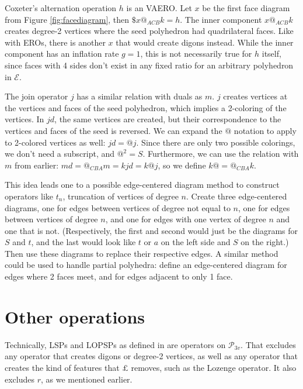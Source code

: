 \documentclass[12pt]{amsart}%
\begin{document}
Coxeter's alternation operation $h$ is an VAERO. Let $x$ be the first face
diagram from Figure \ref{fig:facediagram}, then $\$x@_{ACB}k = h$. The inner
component $x@_{ACB}k$ creates degree-2 vertices where the seed polyhedron had
quadrilateral faces. Like with EROs, there is another $x$ that would create
digons instead. While the inner component has an inflation rate $g=1$,
this is not necessarily true for $h$ itself, since faces with 4 sides don't
exist in any fixed ratio for an arbitrary polyhedron in $\mathcal{E}$.

The join operator $j$ has a similar relation with duals as $m$. $j$ creates
vertices at the vertices and faces of the seed polyhedron, which implies a
2-coloring of the vertices. In $jd$, the same vertices are created, but their
correspondence to the vertices and faces of the seed is reversed. We can expand
the $@$ notation to apply to 2-colored vertices as well: $jd = @j$. Since there
are only two possible colorings, we don't need a subscript, and $@^2 = S$.
Furthermore, we can use the relation with $m$ from earlier: $md = @_{CBA}m =
kjd = k@j$, so we define $k@ = @_{CBA}k$.

This idea leads one to a possible edge-centered diagram method to construct
operators like $t_n$, truncation of vertices of degree $n$. Create three
edge-centered diagrams, one for edges between vertices of degree not equal to
$n$, one for edges between vertices of degree $n$, and one for edges with one
vertex of degree $n$ and one that is not. (Respectively, the first and second
would just be the diagrams for $S$ and $t$, and the last would look like $t$ or
$a$ on the left side and $S$ on the right.) Then use these diagrams to replace
their respective edges. A similar method could be used to handle partial
polyhedra: define an edge-centered diagram for edges where 2 faces meet, and
for edges adjacent to only 1 face.

\section{Other operations}

Technically, LSPs and LOPSPs as defined in \cite{brinkmann} are operators on
$\mathcal{P}_{3v}$. That excludes any operator that creates digons or degree-2
vertices, as well as any operator that creates the kind of features that
$\pounds$ removes, such as the Lozenge operator. It also excludes $r$,
as we mentioned earlier.
\end{document}
